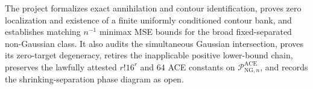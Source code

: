 The project formalizes exact annihilation and contour identification, proves zero localization and existence of a finite uniformly conditioned contour bank, and establishes matching \(n^{-1}\) minimax MSE bounds for the broad fixed-separated non-Gaussian class. It also audits the simultaneous Gaussian intersection, proves its zero-target degeneracy, retires the inapplicable positive lower-bound chain, preserves the lawfully attested \(r!16^r\) and \(64\) ACE constants on \(\mathcal P_{\mathrm{NG},n}^{\mathrm{ACE}}\), and records the shrinking-separation phase diagram as open.